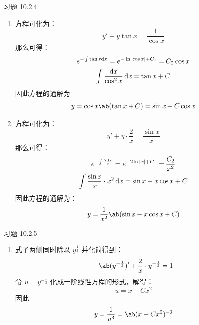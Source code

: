 \begin{problem}
    习题 10.2.4
    \begin{solution}
        \begin{enumerate}
            \item[\textbf{1)}] 方程可化为：
            $$
            y' + y \tan x = \frac{1}{\cos x}
            $$
            那么可得：
            $$
            \begin{gathered}
                e^{-\int \tan x \dd{x}} = e^{-\ln \abs{\cos x} + C_1} = C_2 \cos x \\
                \int \frac{\dd{x}}{\cos^2 x} \dd{x} = \tan x + C
            \end{gathered}
            $$
            因此方程的通解为
            $$
            y = \cos x \ab(\tan x + C) = \sin x + C \cos x
            $$
            \item[\textbf{3)}] 方程可化为：
            $$
            y' + y \cdot \frac{2}{x} = \frac{\sin x}{x}
            $$
            那么可得：
            $$
            \begin{gathered}
                e^{-\int \frac{2 \dd{x}}{x}} = e^{-2 \ln \abs{x} + C_1} = \frac{C_2}{x^2} \\
                \int \frac{\sin x}{x} \cdot x^2 \dd{x} = \sin x - x \cos x + C
            \end{gathered}
            $$
            因此方程的通解为：
            $$
            y = \frac{1}{x^2} \ab(\sin x - x \cos x + C)
            $$
        \end{enumerate}
    \end{solution}
\end{problem}

\begin{problem}
    习题 10.2.5
    \begin{solution}
        \begin{enumerate}
            \item[\textbf{2)}] 式子两侧同时除以 $y^{\frac{4}{3}}$ 并化简得到：
            $$
            -\ab(y^{-\frac{1}{3}})' + \frac{2}{x} \cdot y^{-\frac{1}{3}} = 1
            $$
            令 $u = y^{-\frac{1}{3}}$ 化成一阶线性方程的形式，解得：
            $$
            u = x + C x^2
            $$
            因此
            $$
            y = \frac{1}{u^3} = \ab(x + C x^2)^{-3}
            $$
        \end{enumerate}
    \end{solution}
\end{problem}
